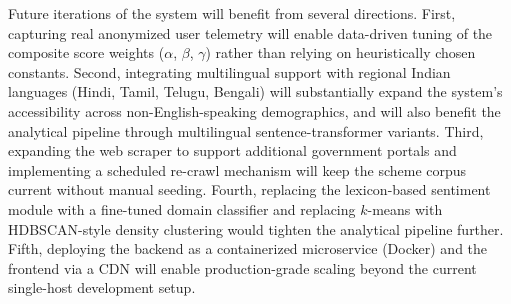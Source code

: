 \documentclass[10pt, journal, twocolumn]{IEEEtran}
\begin{document}
Future iterations of the system will benefit from several directions. First, capturing real anonymized user telemetry will enable data-driven tuning of the composite score weights ($\alpha$, $\beta$, $\gamma$) rather than relying on heuristically chosen constants. Second, integrating multilingual support with regional Indian languages (Hindi, Tamil, Telugu, Bengali) will substantially expand the system's accessibility across non-English-speaking demographics, and will also benefit the analytical pipeline through multilingual sentence-transformer variants. Third, expanding the web scraper to support additional government portals and implementing a scheduled re-crawl mechanism will keep the scheme corpus current without manual seeding. Fourth, replacing the lexicon-based sentiment module with a fine-tuned domain classifier and replacing $k$-means with HDBSCAN-style density clustering would tighten the analytical pipeline further. Fifth, deploying the backend as a containerized microservice (Docker) and the frontend via a CDN will enable production-grade scaling beyond the current single-host development setup.
\end{document}
